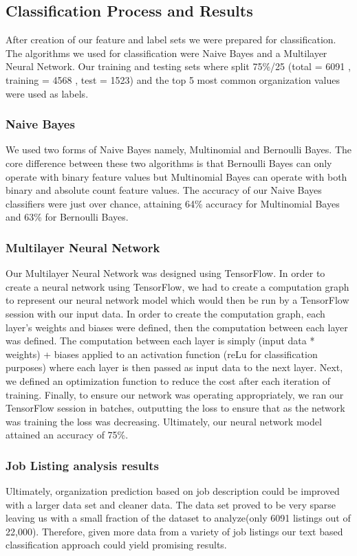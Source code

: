 \subsection{Classification Process and Results}
After creation of our feature and label sets we were prepared for classification. The algorithms we used for classification were Naive Bayes and a Multilayer Neural Network. Our training and testing sets where split 75\%/25 (total = 6091 , training = 4568 , test = 1523) and the top 5 most common organization values were used as labels.  

\subsubsection{Naive Bayes}
We used two forms of Naive Bayes namely, Multinomial and Bernoulli Bayes. The core difference between these two algorithms is that Bernoulli Bayes can only operate with binary feature values but Multinomial Bayes can operate with both binary and absolute count feature values. The accuracy of our Naive Bayes classifiers were just over chance, attaining 64\% accuracy for Multinomial Bayes and 63\% for Bernoulli Bayes. 

\subsubsection{Multilayer Neural Network}
Our Multilayer Neural Network was designed using TensorFlow\cite{tensorFlow}. In order to create a neural network using TensorFlow, we had to create a computation graph to represent our neural network model which would then be run by a TensorFlow session with our input data. In order to create the computation graph, each layer's weights and biases were defined, then the computation between each layer was defined. The computation between each layer is simply (input data * weights) + biases applied to an activation function (reLu for classification purposes) where each layer is then passed as input data to the next layer. Next, we defined an optimization function to reduce the cost after each iteration of training. Finally, to ensure our network was operating appropriately, we ran our TensorFlow session in batches, outputting the loss to ensure that as the network was training the loss was decreasing. Ultimately, our neural network model attained an accuracy of 75\%.

\subsubsection{Job Listing analysis results}
Ultimately, organization prediction based on job description could be improved with a larger data set and cleaner data. The data set proved to be very sparse leaving us with a small fraction of the dataset to analyze(only 6091 listings out of 22,000). Therefore, given more data from a variety of job listings our text based classification approach could yield promising results.


